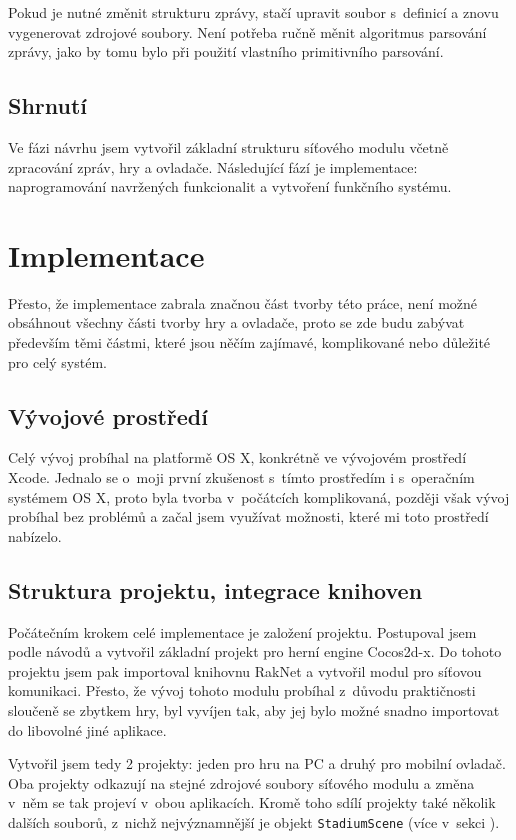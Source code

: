 \documentclass[thesis=B,czech,hidelinks]{FITthesis}[2012/06/26] %
\newcommand{\code}[1]{\texttt{#1}}
\begin{document}
Pokud je nutné změnit strukturu zprávy, stačí upravit soubor s~definicí a znovu vygenerovat zdrojové soubory. Není potřeba ručně měnit algoritmus parsování zprávy, jako by tomu bylo při použití vlastního primitivního parsování.

\subsection{Shrnutí}

Ve fázi návrhu jsem vytvořil základní strukturu síťového modulu včetně zpracování zpráv, hry a ovladače. Následující fází je implementace: naprogramování navržených funkcionalit a vytvoření funkčního systému.

\section{Implementace}

Přesto, že implementace zabrala značnou část tvorby této práce, není možné obsáhnout všechny části tvorby hry a ovladače, proto se zde budu zabývat především těmi částmi, které jsou něčím zajímavé, komplikované nebo důležité pro celý systém.

\subsection{Vývojové prostředí}

Celý vývoj probíhal na platformě OS X, konkrétně ve vývojovém prostředí Xcode. Jednalo se o~moji první zkušenost s~tímto prostředím i s~operačním systémem OS X, proto byla tvorba v~počátcích komplikovaná, později však vývoj probíhal bez problémů a začal jsem využívat možnosti, které mi toto prostředí nabízelo.

\subsection{Struktura projektu, integrace knihoven}

Počátečním krokem celé implementace je založení projektu. Postupoval jsem podle návodů a vytvořil základní projekt pro herní engine Cocos2d-x. Do tohoto projektu jsem pak importoval knihovnu RakNet a vytvořil modul pro síťovou komunikaci. Přesto, že vývoj tohoto modulu probíhal z~důvodu praktičnosti sloučeně se zbytkem hry, byl vyvíjen tak, aby jej bylo možné snadno importovat do libovolné jiné aplikace.

Vytvořil jsem tedy 2 projekty: jeden pro hru na PC a druhý pro mobilní ovladač. Oba projekty odkazují na stejné zdrojové soubory síťového modulu a změna v~něm se tak projeví v~obou aplikacích. Kromě toho sdílí projekty také několik dalších souborů, z~nichž nejvýznamnější je objekt \code{StadiumScene} (více v~sekci ).
\end{document}
